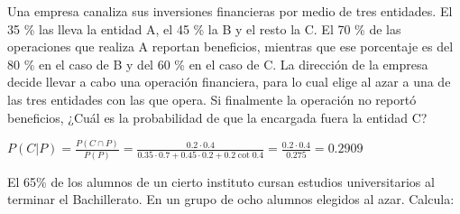 \documentclass[addpoints,spanish, 12pt,a4paper]{exam}
\begin{document}
\begin{questions}
         


\question[2] Una empresa canaliza sus inversiones financieras por medio de tres entidades. El 35 \% las lleva la entidad A, el 45 \% la B y el resto la C. El 70 \% de las operaciones que realiza A reportan beneficios, mientras que ese porcentaje es del 80 \% en el caso de B y del 60 \% en el caso de C. La dirección de la empresa decide llevar a cabo una operación financiera, para lo cual elige al azar a una de las tres entidades con las que opera. Si finalmente la operación no reportó beneficios, ¿Cuál es la probabilidad de que la encargada fuera la entidad C?
\begin{solution}
$P(C|P)=\frac{P(C\cap P)}{P(P)}=\frac{0.2\cdot0.4}{0.35\cdot0.7+0.45\cdot0.2+0.2\cot0.4}=\frac{0.2\cdot0.4}{0.275}=0.2909$
\end{solution}


\question[2] El 65\% de los alumnos de un cierto instituto cursan estudios universitarios al terminar el Bachillerato. En un grupo de ocho alumnos elegidos al azar. Calcula:
\end{questions}
\end{document}
